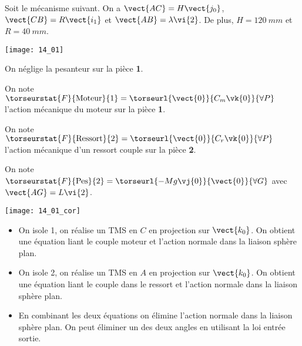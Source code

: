 \normalfalse \difficiletrue \tdifficilefalse
\correctiontrue


\setcounter{question}{0}
\ifcorrection
\else
{}
\fi

\ifprof
\else
Soit le mécanisme suivant. On a $\vect{AC}=H\vect{j_0}$,  $\vect{CB}=R\vect{i_1}$ et $\vect{AB} = \lambda\vi{2}$. De plus, 
$H=\SI{120}{mm}$ et $R=\SI{40}{mm}$. 

\begin{center}
\texttt{[image: 14\_01]}
\end{center}
\fi

On néglige la pesanteur sur la pièce \textbf{1}. 

On note $\torseurstat{F}{\text{Moteur}}{1} = \torseurl{\vect{0}}{C_m\vk{0}}{\forall P}$ l'action mécanique du moteur sur la pièce \textbf{1}.

On note $\torseurstat{F}{\text{Ressort}}{2} = \torseurl{\vect{0}}{C_r\vk{0}}{\forall P}$ l'action mécanique d'un ressort couple sur la pièce \textbf{2}. 

On note $\torseurstat{F}{\text{Pes}}{2} = \torseurl{-Mg\vj{0}}{\vect{0}}{\forall G}$ avec $\vect{AG}=L\vi{2}$. 

\ifprof
\begin{center}
\texttt{[image: 14\_01\_cor]}
\end{center}
\else
\fi

\ifprof
\begin{itemize}
\item On isole 1, on réalise un TMS en $C$ en projection sur $\vect{k_0}$. On obtient une équation liant le couple moteur et l'action normale dans la liaison sphère plan. 
\item On isole 2, on réalise un TMS en $A$ en projection sur $\vect{k_0}$. On obtient une équation liant le couple dans le ressort et l'action normale dans la liaison sphère plan. 
\item En combinant les deux équations on élimine l'action normale dans la liaison sphère plan. On peut éliminer un des deux angles en utilisant la loi entrée sortie.
\end{itemize}
\else
\fi


